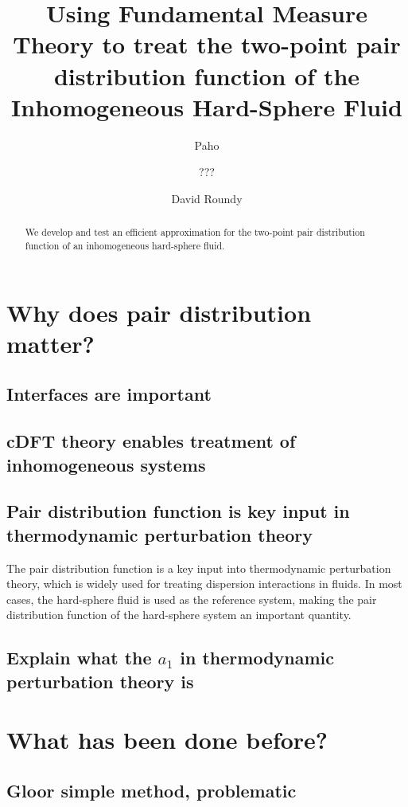 \documentclass[letterpaper,twocolumn,amsmath,amssymb,pre]{revtex4-1}
\begin{document}
\title{Using Fundamental Measure Theory to treat the two-point pair
  distribution function of the Inhomogeneous Hard-Sphere Fluid}

\author{Paho}
\author{???}
\author{David Roundy}

\begin{abstract}
  We develop and test an efficient approximation for the two-point
  pair distribution function of an inhomogeneous hard-sphere fluid.
\end{abstract}

\section{Why does pair distribution matter?}
\subsection{Interfaces are important}
\subsection{cDFT theory enables treatment of inhomogeneous systems}
\subsection{Pair distribution function is key input in thermodynamic perturbation theory}
The pair distribution function is a key input into thermodynamic
perturbation theory, which is widely used for treating dispersion
interactions in fluids.  In most cases, the hard-sphere fluid is used
as the reference system, making the pair distribution function of the
hard-sphere system an important quantity.
\subsection{Explain what the $a_1$ in thermodynamic perturbation theory is}

\section{What has been done before?}
\subsection{Gloor simple method, problematic}
\end{document}
